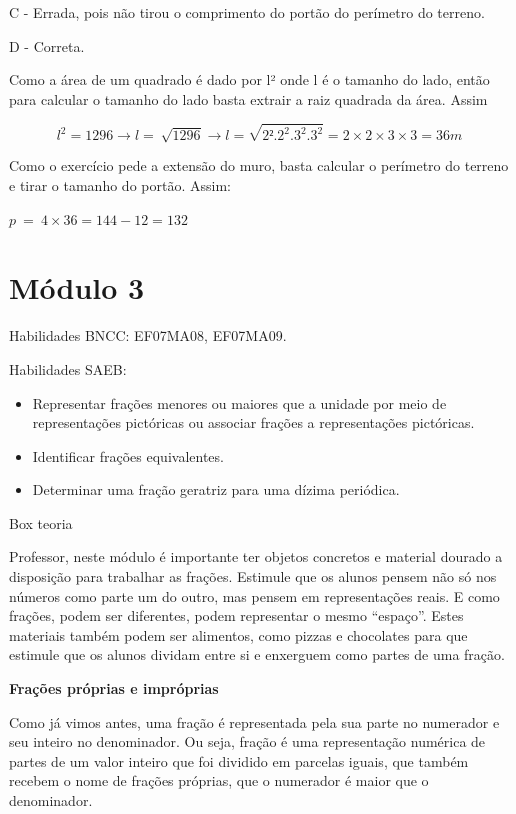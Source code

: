 {{C - Errada, pois não tirou o comprimento do portão do perímetro do
terreno.

D - Correta.

Como a área de um quadrado é dado por l² onde l é o tamanho do lado,
então para calcular o tamanho do lado basta extrair a raiz quadrada da
área. Assim

\[l^{2} = 1296 \rightarrow l = \ \sqrt{1296} \rightarrow l = \sqrt{2².2^{2}.3^{2}.3^{2}} = 2 \times 2 \times 3 \times 3 = 36m\ \]

Como o exercício pede a extensão do muro, basta calcular o perímetro do
terreno e tirar o tamanho do portão. Assim:

\(p\  = \ 4 \times 36 = 144 - 12 = 132\)

\hypertarget{muxf3dulo-3}{%
\section{Módulo 3}

Habilidades BNCC: EF07MA08, EF07MA09.

Habilidades SAEB:

\begin{itemize}
\item
  Representar frações menores ou maiores que a unidade por meio de
  representações pictóricas ou associar frações a representações
  pictóricas.
\item
  Identificar frações equivalentes.
\item
  Determinar uma fração geratriz para uma dízima periódica.
\end{itemize}

Box teoria

Professor, neste módulo é importante ter objetos concretos e material
dourado a disposição para trabalhar as frações. Estimule que os alunos
pensem não só nos números como parte um do outro, mas pensem em
representações reais. E como frações, podem ser diferentes, podem
representar o mesmo ``espaço''. Estes materiais também podem ser
alimentos, como pizzas e chocolates para que estimule que os alunos
dividam entre si e enxerguem como partes de uma fração.

\textbf{Frações próprias e impróprias}

Como já vimos antes, uma fração é representada pela sua parte no
numerador e seu inteiro no denominador. Ou seja, fração é uma
representação numérica de partes de um valor inteiro que foi dividido em
parcelas iguais, que também recebem o nome de frações próprias, que o
numerador é maior que o denominador.

}}}
